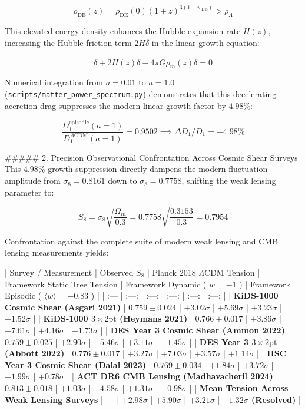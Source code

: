\documentclass[11pt,a4paper]{article}
\theoremstyle{definition}
\theoremstyle{remark}
\begin{document}
\begin{equation}
\rho_{\text{DE}}(z) = \rho_{\text{DE}}(0) (1+z)^{3(1+w_{\text{DE}})} > \rho_\Lambda
\end{equation}


This elevated energy density enhances the Hubble expansion rate $H(z)$, increasing the Hubble friction term $2H\dot{\delta}$ in the linear growth equation:


\begin{equation}
\ddot{\delta} + 2 H(z) \dot{\delta} - 4\pi G \rho_m(z) \delta = 0
\end{equation}


Numerical integration from $a = 0.01$ to $a = 1.0$ (\href{../../scripts/matter_power_spectrum.py}{\texttt{scripts/matter_power_spectrum.py}}) demonstrates that this decelerating accretion drag suppresses the modern linear growth factor by \textbf{$4.98\%$}:


\begin{equation}
\frac{D_1^{\text{episodic}}(a=1)}{D_1^{\Lambda\text{CDM}}(a=1)} = 0.9502 \implies \Delta D_1 / D_1 = -4.98\%
\end{equation}


\#\#\#\#\# 2. Precision Observational Confrontation Across Cosmic Shear Surveys
This $4.98\%$ growth suppression directly dampens the modern fluctuation amplitude from $\sigma_8 = 0.8161$ down to $\sigma_8 = 0.7758$, shifting the weak lensing parameter to:


\begin{equation}
\boxed{S_8 = \sigma_8 \sqrt{\frac{\Omega_m}{0.3}} = 0.7758 \sqrt{\frac{0.3153}{0.3}} = 0.7954}
\end{equation}


Confrontation against the complete suite of modern weak lensing and CMB lensing measurements yields:

| Survey / Measurement | Observed $S_8$ | Planck 2018 $\Lambda\text{CDM}$ Tension | Framework Static Tree Tension | Framework Dynamic ( $w=-1$ ) | Framework Episodic ( $\langle w \rangle = -0.83$ ) |
| :--- | :---: | :---: | :---: | :---: | :---: |
| \textbf{KiDS-1000 Cosmic Shear (Asgari 2021)} | $0.759 \pm 0.024$ | $+3.02\sigma$ | $+5.69\sigma$ | $+3.23\sigma$ | \textbf{$+1.52\sigma$} |
| \textbf{KiDS-1000 $3\times 2\text{pt}$ (Heymans 2021)} | $0.766 \pm 0.017$ | $+3.86\sigma$ | $+7.61\sigma$ | $+4.16\sigma$ | \textbf{$+1.73\sigma$} |
| \textbf{DES Year 3 Cosmic Shear (Ammon 2022)} | $0.759 \pm 0.025$ | $+2.90\sigma$ | $+5.46\sigma$ | $+3.11\sigma$ | \textbf{$+1.45\sigma$} |
| \textbf{DES Year 3 $3\times 2\text{pt}$ (Abbott 2022)} | $0.776 \pm 0.017$ | $+3.27\sigma$ | $+7.03\sigma$ | $+3.57\sigma$ | \textbf{$+1.14\sigma$} |
| \textbf{HSC Year 3 Cosmic Shear (Dalal 2023)} | $0.769 \pm 0.034$ | $+1.84\sigma$ | $+3.72\sigma$ | $+1.99\sigma$ | \textbf{$+0.78\sigma$} |
| \textbf{ACT DR6 CMB Lensing (Madhavacheril 2024)} | $0.813 \pm 0.018$ | $+1.03\sigma$ | $+4.58\sigma$ | $+1.31\sigma$ | \textbf{$-0.98\sigma$} |
| \textbf{Mean Tension Across Weak Lensing Surveys} | — | \textbf{$+2.98\sigma$} | \textbf{$+5.90\sigma$} | \textbf{$+3.21\sigma$} | \textbf{$+1.32\sigma$ (Resolved)} |
\end{document}
